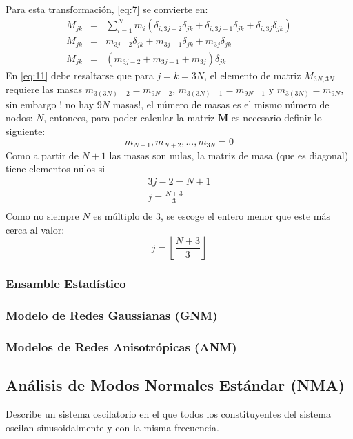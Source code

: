 Para esta transformaci\'{o}n, \eqref{eq:7} se convierte en:
\begin{eqnarray}
M_{jk}&=&\sum_{i=1}^{N} m_{i}\left( \delta_{i,3j-2}\delta_{jk}+\delta_{i,3j-1}\delta_{jk}+  \delta_{i,3j}\delta_{jk}\right)\nonumber \\
M_{jk}&=&m_{3j-2}\delta_{jk}+m_{3j-1}\delta_{jk}+m_{3j}\delta_{jk} \nonumber \\
M_{jk}&=&\left( m_{3j-2}+m_{3j-1}+m_{3j} \right) \delta_{jk}
\end{eqnarray}\label{eq:11}
En \eqref{eq:11} debe resaltarse que para $j=k=3N$, el elemento de matriz $M_{3N,3N}$ requiere las masas $m_{3(3N)-2}=m_{9N-2}$, $m_{3(3N)-1}=m_{9N-1}$ y $m_{3(3N)}=m_{9N}$, sin embargo ! no hay $9N$ masas!, el n\'{u}mero de masas es el mismo n\'{u}mero de nodos: $N$, entonces, para poder calcular la matriz $\mathbf{M}$ es necesario definir lo siguiente:
\begin{equation}
m_{N+1},m_{N+2},...,m_{3N}=0
\end{equation}\label{eq:12}
Como a partir de $N+1$ las masas son nulas, la matriz de masa (que es diagonal) tiene elementos nulos si  
\begin{eqnarray*}
3j-2=N+1\\
j=\frac{N+3}{3} \\
\end{eqnarray*}
Como no siempre $N$ es m\'{u}ltiplo de 3, se escoge el entero menor que este m\'{a}s cerca al valor:
\begin{equation}
j=\left \lfloor\frac{N+3}{3}\right \rfloor
\end{equation}\label{eq:13}
\subsubsection{Ensamble Estad\'{i}stico}
\subsubsection{Modelo de Redes Gaussianas (GNM)}
\subsubsection{Modelos de Redes Anisotr\'{o}picas (ANM)}
\subsection{An\'{a}lisis de Modos Normales Est\'{a}ndar (NMA)}
Describe un sistema oscilatorio en el que todos los constituyentes del sistema oscilan sinusoidalmente y con la misma frecuencia.
